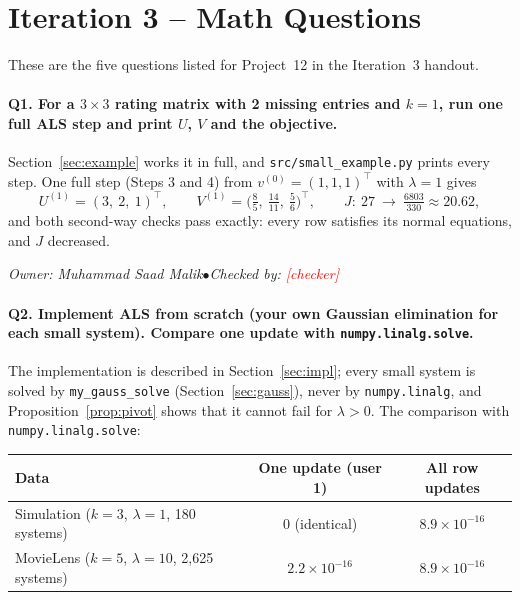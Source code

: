 \documentclass[11pt]{article}
\theoremstyle{definition}
\newcommand{\T}{^{\top}}
\newcommand{\code}[1]{\texttt{#1}}
\newcommand{\tbd}[1]{\textcolor{red}{[#1]}}
\newcommand{\owner}[2]{\par\smallskip\noindent\hfill
  {\footnotesize\itshape Owner: #1\enspace$\bullet$\enspace Checked by: #2}\par\medskip}
\begin{document}
\section{Iteration 3 -- Math Questions}
\label{sec:questions}

These are the five questions listed for Project~12 in the Iteration~3 handout.

\paragraph{Q1. For a $3\times3$ rating matrix with 2 missing entries and $k = 1$, run one full ALS
step and print $U$, $V$ and the objective.}

Section~\ref{sec:example} works it in full, and \code{src/small\_example.py} prints every step. One
full step (Steps 3 and 4) from $v^{(0)} = (1,1,1)\T$ with $\lambda = 1$ gives
\[
U^{(1)} = (3,\ 2,\ 1)\T, \qquad V^{(1)} = \bigl(\tfrac85,\ \tfrac{14}{11},\ \tfrac56\bigr)\T,
\qquad J: \ 27 \ \to\ \tfrac{6803}{330} \approx 20.62,
\]
and both second-way checks pass exactly: every row satisfies its normal equations, and $J$
decreased.

\owner{Muhammad Saad Malik}{\tbd{checker}}

\paragraph{Q2. Implement ALS from scratch (your own Gaussian elimination for each small system).
Compare one update with \code{numpy.linalg.solve}.}

The implementation is described in Section~\ref{sec:impl}; every small system is solved by
\code{my\_gauss\_solve} (Section~\ref{sec:gauss}), never by \code{numpy.linalg}, and
Proposition~\ref{prop:pivot} shows that it cannot fail for $\lambda > 0$. The comparison with
\code{numpy.linalg.solve}:

\begin{center}
\begin{tabular}{@{}lcc@{}}
\toprule
Data & One update (user 1) & All row updates \\
\midrule
Simulation ($k = 3$, $\lambda = 1$, 180 systems) & 0 (identical) & $8.9\times10^{-16}$ \\
MovieLens ($k = 5$, $\lambda = 10$, 2{,}625 systems) & $2.2\times10^{-16}$ & $8.9\times10^{-16}$ \\
\bottomrule
\end{tabular}
\end{center}
\end{document}
